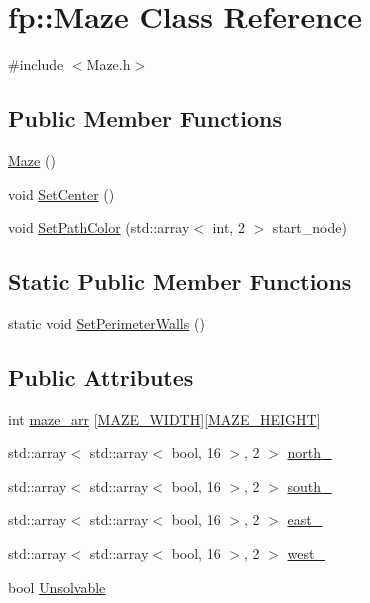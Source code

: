 \hypertarget{classfp_1_1_maze}{}\section{fp\+:\+:Maze Class Reference}
\label{classfp_1_1_maze}


{\ttfamily \#include $<$Maze.\+h$>$}

\subsection*{Public Member Functions}
\begin{DoxyCompactItemize}
\item 
\hyperlink{classfp_1_1_maze_af090b97595ed34cad9f7c8de9e79a127}{Maze} ()
\item 
void \hyperlink{classfp_1_1_maze_af1ffa713840a40bdcedb99e79ea5bde3}{Set\+Center} ()
\item 
void \hyperlink{classfp_1_1_maze_ace62554f667bd404e059bb61166e44f0}{Set\+Path\+Color} (std\+::array$<$ int, 2 $>$ start\+\_\+node)
\end{DoxyCompactItemize}
\subsection*{Static Public Member Functions}
\begin{DoxyCompactItemize}
\item 
static void \hyperlink{classfp_1_1_maze_a689d998d05f671c2644804ee912c5e79}{Set\+Perimeter\+Walls} ()
\end{DoxyCompactItemize}
\subsection*{Public Attributes}
\begin{DoxyCompactItemize}
\item 
int \hyperlink{classfp_1_1_maze_a8610720d37ec84d7b2192b13334ea525}{maze\+\_\+arr} \mbox{[}\hyperlink{classfp_1_1_maze_ae976c87b67bf82c41ede75a19ac28c2c}{M\+A\+Z\+E\+\_\+\+W\+I\+D\+TH}\mbox{]}\mbox{[}\hyperlink{classfp_1_1_maze_a3cee2050b4d60bceacc9307e7016b931}{M\+A\+Z\+E\+\_\+\+H\+E\+I\+G\+HT}\mbox{]}
\item 
std\+::array$<$ std\+::array$<$ bool, 16 $>$, 2 $>$ \hyperlink{classfp_1_1_maze_a7a16c86454b8898a4ba6a913cbfcb67e}{north\+\_\+}
\item 
std\+::array$<$ std\+::array$<$ bool, 16 $>$, 2 $>$ \hyperlink{classfp_1_1_maze_ab494935167a2bf7f358b72e6c032eef8}{south\+\_\+}
\item 
std\+::array$<$ std\+::array$<$ bool, 16 $>$, 2 $>$ \hyperlink{classfp_1_1_maze_ac1d6b5fc763eff421af708aa39f2141a}{east\+\_\+}
\item 
std\+::array$<$ std\+::array$<$ bool, 16 $>$, 2 $>$ \hyperlink{classfp_1_1_maze_afc8b97457d6f4ff69ed812741982c298}{west\+\_\+}
\item 
bool \hyperlink{classfp_1_1_maze_abdf504125bc0cd3ea18ba17b0887a5a2}{Unsolvable}
\end{DoxyCompactItemize}
